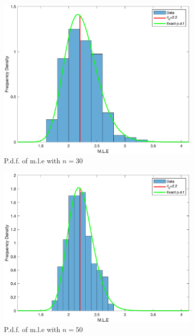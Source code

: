 \documentclass[10pt,a4paper,notitlepage]{article}
\begin{document}
\begin{figure}[H]
\centering
\includegraphics[width=10cm]{Image_8_2}
\caption{P.d.f. of m.l.e with $n=30$}
\end{figure}
\begin{figure}[H]
\centering
\includegraphics[width=10cm]{Image_8_3}
\caption{P.d.f. of m.l.e with $n=50$}\label{fg:8.2}
\end{figure}
\end{document}
